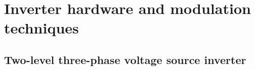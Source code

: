 
\section{Inverter hardware and modulation techniques}

\subsection{Two-level three-phase voltage source inverter}

